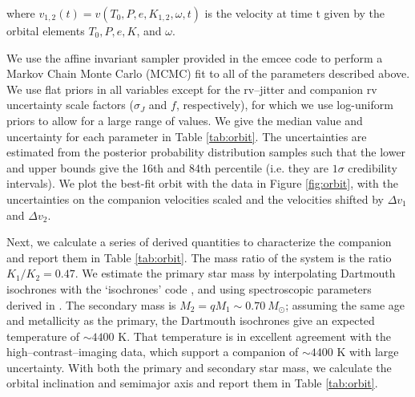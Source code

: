 where $v_{1,2}(t) = v(T_0, P, e, K_{1,2}, \omega, t)$ is the velocity at time t given by the orbital elements $T_0, P, e, K$, and $\omega$.

We use the affine invariant sampler provided in the emcee code \citep{emcee} to perform a Markov Chain Monte Carlo (MCMC) fit to all of the parameters described above. We use flat priors in all variables except for the rv--jitter and companion rv uncertainty scale factors ($\sigma_J$ and $f$, respectively), for which we use log-uniform priors to allow for a large range of values.  We give the median value and uncertainty for each parameter in Table \ref{tab:orbit}. The uncertainties are estimated from the posterior probability distribution samples such that the lower and upper bounds give the 16th and 84th percentile (i.e. they are $1\sigma$ credibility intervals). We plot the best-fit orbit with the data in Figure \ref{fig:orbit}, with the uncertainties on the companion velocities scaled and the velocities shifted by $\Delta v_1$ and $\Delta v_2$. 

Next, we calculate a series of derived quantities to characterize the companion and report them in Table \ref{tab:orbit}. The mass ratio of the system is the ratio $K_1/K_2 = 0.47$. We estimate the primary star mass by interpolating Dartmouth isochrones \citep{Dotter2008} with the `isochrones' code \citep[described in][]{Montet2015}, and using spectroscopic parameters derived in \citet{Endl2015}. The secondary mass is $M_2 = qM_1 \sim 0.70\ M_{\odot}$; assuming the same age and metallicity as the primary, the Dartmouth isochrones give an expected temperature of ${\sim}4400 $ K. That temperature is in excellent agreement with the high--contrast--imaging data, which support a companion of ${\sim}4400$ K with large uncertainty. With both the primary and secondary star mass, we calculate the orbital inclination and semimajor axis and report them in Table \ref{tab:orbit}.



